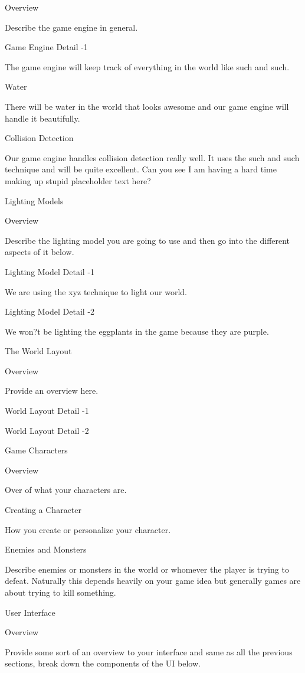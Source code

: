 \documentclass[a4paper]{article}
\begin{document}
Overview

	Describe the game engine in general.

Game Engine Detail -1

	The game engine will keep track of everything in the world like such and such.

Water

	There will be water in the world that looks awesome and our game engine will handle it beautifully.

Collision Detection

	Our game engine handles collision detection really well.  It uses the such and such technique and will be quite excellent.  Can you see I am having a hard time making up stupid placeholder text here?




Lighting Models

Overview

	Describe the lighting model you are going to use and then go into the different aspects of it below.

Lighting Model Detail -1

	We are using the xyz technique to light our world.

Lighting Model Detail -2

	We won?t be lighting the eggplants in the game because they are purple.

The World Layout

Overview

	Provide an overview here.

World Layout Detail -1

World Layout Detail -2

Game Characters

Overview

	Over of what your characters are.

Creating a Character

	How you create or personalize your character.

Enemies and Monsters

	Describe enemies or monsters in the world or whomever the player is trying to defeat.  Naturally this depends heavily on your game idea but generally games are about trying to kill something.

User Interface

Overview

	Provide some sort of an overview to your interface and same as all the previous sections, break down the components of the UI below.
\end{document}
